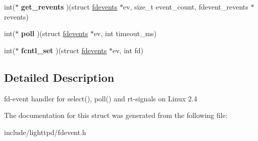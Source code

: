 \begin{CompactItemize}
\item 
\hypertarget{structfdevents_b02930106a57a363ef1bc1c4c3ba84a3}{
int($\ast$ \textbf{get\_\-revents} )(struct \hyperlink{structfdevents}{fdevents} $\ast$ev, size\_\-t event\_\-count, fdevent\_\-revents $\ast$revents)}
\label{structfdevents_b02930106a57a363ef1bc1c4c3ba84a3}

\item 
\hypertarget{structfdevents_45c7aaf2c8b8da25827f0c8a9a0e90c8}{
int($\ast$ \textbf{poll} )(struct \hyperlink{structfdevents}{fdevents} $\ast$ev, int timeout\_\-ms)}
\label{structfdevents_45c7aaf2c8b8da25827f0c8a9a0e90c8}

\item 
\hypertarget{structfdevents_8f9881ac88d76f35a2160903c1a839ad}{
int($\ast$ \textbf{fcntl\_\-set} )(struct \hyperlink{structfdevents}{fdevents} $\ast$ev, int fd)}
\label{structfdevents_8f9881ac88d76f35a2160903c1a839ad}

\end{CompactItemize}


\subsection{Detailed Description}
fd-event handler for select(), poll() and rt-signals on Linux 2.4 

The documentation for this struct was generated from the following file:\begin{CompactItemize}
\item 
include/lighttpd/fdevent.h\end{CompactItemize}
